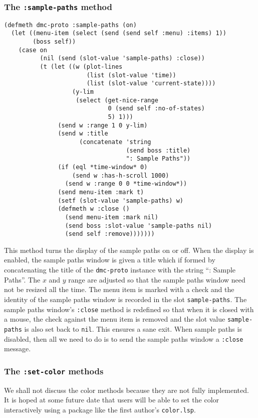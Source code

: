 \subsubsection{The {\tt :sample-paths} method}
\label{subsubsec:sample-paths}
\begin{verbatim}
(defmeth dmc-proto :sample-paths (on)
  (let ((menu-item (select (send (send self :menu) :items) 1))
        (boss self))
    (case on
          (nil (send (slot-value 'sample-paths) :close))
          (t (let ((w (plot-lines 
                       (list (slot-value 'time))
                       (list (slot-value 'current-state))))
                   (y-lim 
                    (select (get-nice-range 
                             0 (send self :no-of-states) 
                             5) 1)))
               (send w :range 1 0 y-lim)
               (send w :title 
                     (concatenate 'string 
                                  (send boss :title)
                                  ": Sample Paths"))
               (if (eql *time-window* 0)
                   (send w :has-h-scroll 1000)
                 (send w :range 0 0 *time-window*))
               (send menu-item :mark t)
               (setf (slot-value 'sample-paths) w)
               (defmeth w :close ()
                 (send menu-item :mark nil)
                 (send boss :slot-value 'sample-paths nil)
                 (send self :remove)))))))
\end{verbatim}
This method turns the display of the sample paths on or off. When the
display is enabled, the sample paths window is given a title which if
formed by concatenating the title of the {\tt dmc-proto} instance with
the string ``: Sample Paths''. The $x$ and $y$ range are adjusted so
that the sample paths window need not be resized all the time. The
menu item is marked with a check and the identity of the sample paths
window is recorded in the slot {\tt sample-paths}. The sample paths
window's {\tt :close} method is redefined so that when it is closed
with a mouse, the check against the menu item is removed and the
slot value {\tt sample-paths} is also set back to {\tt nil}. This
ensures a sane exit. When sample paths is disabled, then all we need
to do is to send the sample paths window a {\tt :close} message.  

\subsubsection{The {\tt :set-color} methods}
\label{subsubsec:set-color}
We shall not discuss the color methods because they are not fully
implemented. It is hoped at some future date that users will be able
to set the color interactively using a package like the first author's
{\tt color.lsp}.



